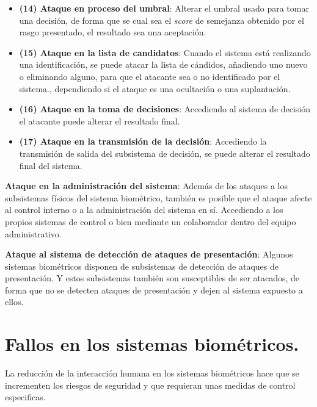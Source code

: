 \begin{itemize}
    \item 
    \textbf{(14) Ataque en proceso del umbral}:
    Alterar el umbral usado para tomar una decisión, de forma que se cual sea el \textit{score} de semejanza obtenido por el rasgo presentado, el resultado sea una aceptación.
    \item 
    \textbf{(15) Ataque en la lista de candidatos}:
    Cuando el sistema está realizando una identificación, se puede atacar la lista de cándidos, añadiendo uno nuevo o eliminando alguno, para que el atacante sea o no identificado por el sistema., dependiendo si el ataque es una ocultación o una suplantación. 
    \item 
    \textbf{(16) Ataque en la toma de decisiones}:
    Accediendo al sistema de decisión el atacante puede alterar el resultado final. 
    \item 
    \textbf{(17) Ataque en la transmisión de la decisión}:
    Accediendo la transmisión de salida del subsistema de decisión, se puede alterar el resultado final del sistema. 
\end{itemize}    

\textbf{Ataque en la administración del sistema}: Además de los ataques a los subsistemas físicos del sistema biométrico, también es posible que el ataque afecte al control interno o a la administración del sistema en sí. Accediendo a los propios sistemas de control o bien mediante un colaborador dentro del equipo administrativo. 
    
\textbf{Ataque al sistema de detección de ataques de presentación}: Algunos sistemas biométricos disponen de subsistemas de detección de ataques de presentación. Y estos subsistemas también son susceptibles de ser atacados, de forma que no se detecten ataques de presentación y dejen al sistema expuesto a ellos.
    

\section{Fallos en los sistemas biométricos.}\label{sec:fallosBiometricos}



La reducción de la interacción humana en los sistemas biométricos hace que se incrementen los riesgos de seguridad y que requieran unas medidas de control especificas.

